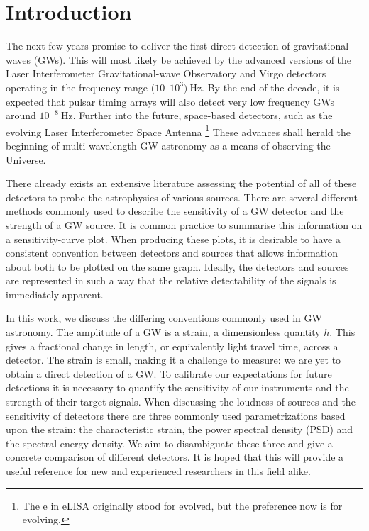 \section{Introduction}

The next few years  promise to deliver the first direct detection of gravitational waves (GWs). This will most likely be achieved by the advanced versions of the Laser Interferometer Gravitational-wave Observatory \citep[LIGO;][]{2010CQGra..27h4006H} and Virgo \citep{Acernese2009} detectors operating in the frequency range $(10$--$10^{3})~\mathrm{Hz}$. By the end of the decade, it is expected that pulsar timing arrays \citep[PTAs;][]{1990ApJ361300F} will also detect very low frequency GWs around $10^{-8}~\mathrm{Hz}$. Further into the future, space-based detectors, such as the evolving Laser Interferometer Space Antenna \citep[eLISA;][]{TheGravitationalUniverse}
\footnote{The e in eLISA originally stood for evolved, but the preference now is for evolving.}
These advances shall herald the beginning of multi-wavelength GW astronomy as a means of observing the Universe.

There already exists an extensive literature assessing the potential of all of these detectors to probe the astrophysics of various sources. There are several different methods commonly used to describe the sensitivity of a GW detector and the strength of a GW source. It is common practice to summarise this information on a sensitivity-curve plot. When producing these plots, it is desirable to have a consistent convention between detectors and sources that allows information about both to be plotted on the same graph. Ideally, the detectors and sources are represented in such a way that the relative detectability of the signals is immediately apparent.

In this work, we discuss the differing conventions commonly used in GW astronomy. The amplitude of a GW is a strain, a dimensionless quantity $h$. This gives a fractional change in length, or equivalently light travel time, across a detector. The strain is small, making it a challenge to measure: we are yet to obtain a direct detection of a GW. To calibrate our expectations for future detections it is necessary to quantify the sensitivity of our instruments and the strength of their target signals. When discussing the loudness of sources and the sensitivity of detectors there are three commonly used parametrizations based upon the strain: the characteristic strain, the power spectral density (PSD) and the spectral energy density. We aim to disambiguate these three and give a concrete comparison of different detectors. It is hoped that this will provide a useful reference for new and experienced researchers in this field alike. 


